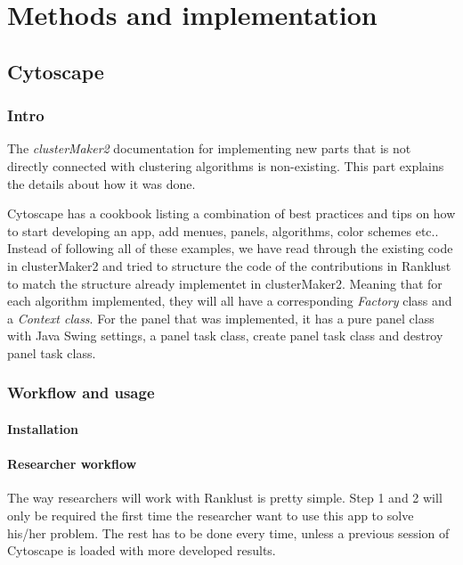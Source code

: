 \part{Methods and implementation}
\label{pa:methods}

\chapter{Cytoscape}
\section{Intro}
The \textit{clusterMaker2} documentation for implementing new parts that is not
directly connected with clustering algorithms is non-existing. This part
explains the details about how it was done.

Cytoscape has a cookbook\cite{cytoscape-cookbook} listing a combination of best
practices and tips on how to start developing an app, add menues, panels,
algorithms, color schemes etc.. Instead of following all of these examples, we
have read through the existing code in clusterMaker2\cite{cm2-github} and tried
to structure the code of the contributions in Ranklust to match the structure
already implementet in clusterMaker2. Meaning that for each algorithm
implemented, they will all have a corresponding \textit{Factory} class and a
\textit{Context class}. For the panel that was implemented, it has a pure panel
class with Java Swing\cite{java-swing} settings, a panel task class, create
panel task class and destroy panel task class.

\section{Workflow and usage}
\subsection{Installation}

\subsection{Researcher workflow}
The way researchers will work with Ranklust is pretty simple. Step 1 and 2 will
only be required the first time the researcher want to use this app to solve
his/her problem. The rest has to be done every time, unless a previous session
of Cytoscape is loaded with more developed results.

